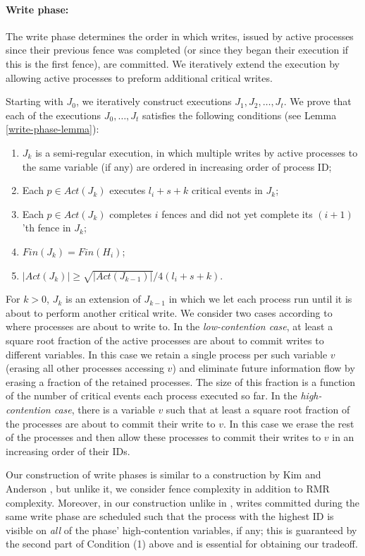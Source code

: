 \paragraph{Write phase:}
The write phase determines the order in which writes, issued by active processes since their previous fence was completed (or since they began their execution if this is the first fence), are committed. We iteratively extend the execution by allowing active processes to preform additional critical writes.

Starting with $J_0$, we iteratively construct executions $J_1,J_2,\ldots,J_t$. We prove that each of the executions $J_0, \ldots, J_t$  satisfies the following conditions (see Lemma \ref{write-phase-lemma}):

\begin{enumerate}[(1)]
	\item $J_k$ is a semi-regular execution, in which multiple writes by active processes to the same variable (if any) are ordered in increasing order of process ID;
	\item Each $p \in Act(J_k)$ executes $l_i+s+k$ critical events in $J_k$;
	\item Each $p\in Act(J_k)$ completes $i$ fences and did not yet complete its $(i+1)$'th fence in $J_k$;
	\item $Fin(J_k) = Fin(H_i)$;
	\item $|Act(J_k)| \geq \sqrt{|Act(J_{k-1})|}/4(l_i+s+k)$.
\end{enumerate}


For $k>0$, $J_k$ is an extension of $J_{k-1}$ in which we let each process run until it is about to perform another critical write. We consider two cases according to where processes are about to write to. In the \emph{low-contention case}, at least a square root fraction of the active processes are about to commit writes to different variables. In this case we retain a single process per such variable $v$ (erasing all other processes accessing $v$) and eliminate future information flow by erasing a fraction of the retained processes. The size of this fraction is a function of the number of critical events each process executed so far. In the \emph{high-contention case}, there is a variable $v$ such that at least a square root fraction of the processes are about to commit their write to $v$. In this case we erase the rest of the processes and then allow these processes to commit their writes to $v$ in an increasing order of their IDs.

Our construction of write phases is similar to a construction by Kim and Anderson \cite{DBLP:journals/dc/KimA12}, but unlike it, we consider fence complexity in addition to RMR complexity. Moreover, in our construction unlike in \cite{DBLP:journals/dc/KimA12}, writes committed during the same write phase are scheduled such that the process with the highest ID is visible on \textit{all} of the phase' high-contention variables, if any; this is guaranteed by the second part of Condition (1) above and is essential for obtaining our tradeoff.

